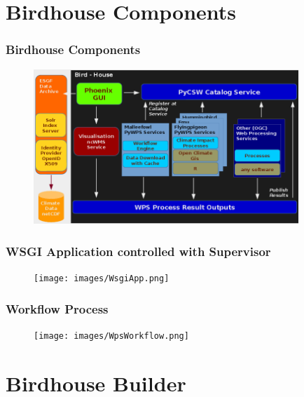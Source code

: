 \documentclass{beamer}
\begin{document}
  \section{Birdhouse Components}

  \begin{frame}[plain]
    \frametitle{Birdhouse Components}
    \begin{figure}
      \begin{center}
        \includegraphics[width=10cm]{images/birdhouse.png}
      \end{center}
    \end{figure}
  \end{frame}

  \begin{frame}[plain]
    \frametitle{WSGI Application controlled with Supervisor}
    \begin{figure}
      \texttt{[image: images/WsgiApp.png]}
    \end{figure}
  \end{frame}

  \begin{frame}[plain]
    \frametitle{Workflow Process}
    \begin{figure}
      \texttt{[image: images/WpsWorkflow.png]}
    \end{figure}
  \end{frame}

  \section{Birdhouse Builder}
\end{document}
